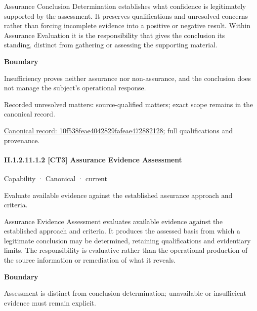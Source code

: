Assurance Conclusion Determination establishes what confidence is legitimately supported by the assessment. It preserves qualifications and unresolved concerns rather than forcing incomplete evidence into a positive or negative result. Within Assurance Evaluation it is the responsibility that gives the conclusion its standing, distinct from gathering or assessing the supporting material.



\textbf{Boundary}



Insufficiency proves neither assurance nor non-assurance, and the conclusion does not manage the subject's operational response.


{\small Recorded unresolved matters: source-qualified matters; exact scope remains in the canonical record.}\par
{\footnotesize \href{../../../../continuum/strategy/capability/10f538feae4042829fafeae472882128.md}{Canonical record: 10f538feae4042829fafeae472882128}; full qualifications and provenance.}\par
\paragraph*{II.1.2.11.1.2 [CT3] Assurance Evidence Assessment}
\label{navigation:II.1.2.11.1.2}

\label{element:1b295763b37f4622bd1bb80c6ea3741c}
{\small Capability · Canonical · current}\par

Evaluate available evidence against the established assurance approach and criteria.



Assurance Evidence Assessment evaluates available evidence against the established approach and criteria. It produces the assessed basis from which a legitimate conclusion may be determined, retaining qualifications and evidentiary limits. The responsibility is evaluative rather than the operational production of the source information or remediation of what it reveals.



\textbf{Boundary}



Assessment is distinct from conclusion determination; unavailable or insufficient evidence must remain explicit.


